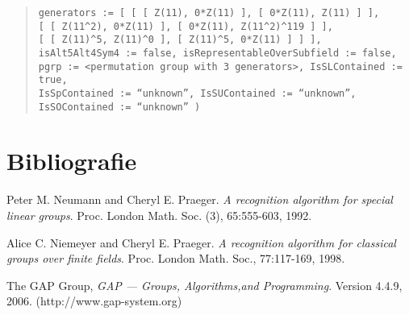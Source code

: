 \documentclass[a4paper,11pt]{article}
\theoremstyle{bla}
\begin{document}
\begin{quote}
  \hspace*{-1cm} \texttt{generators := [ [ [ Z(11), 0*Z(11) ], [ 0*Z(11), Z(11) ] ],}\\
      \hspace*{-1cm} \texttt{[ [ Z(11\^{}2), 0*Z(11) ], [ 0*Z(11), Z(11\^{}2)\^{}119 ] ],}\\
      \hspace*{-1cm} \texttt{[ [ Z(11)\^{}5, Z(11)\^{}0 ], [ Z(11)\^{}5, 0*Z(11) ] ] ],}\\
  \hspace*{-1cm} \texttt{isAlt5Alt4Sym4 := false, isRepresentableOverSubfield := false,}\\
  \hspace*{-1cm} \texttt{pgrp := <permutation group with 3 generators>, IsSLContained := true,}\\
  \hspace*{-1cm} \texttt{IsSpContained := ``unknown'', IsSUContained := ``unknown'',}\\
  \hspace*{-1cm} \texttt{IsSOContained := ``unknown'' )}

\end{quote}


\section{Bibliografie}

\begin{thebibliography}{bibl}
  Peter M. Neumann and Cheryl E. Praeger. \textit{A recognition algorithm for special linear groups}. Proc. London Math. Soc. (3), 65:555-603, 1992.

  Alice C. Niemeyer and Cheryl E. Praeger. \textit{A recognition algorithm for classical groups over finite fields}. Proc. London Math. Soc., 77:117-169, 1998.

  The GAP Group, \textit{GAP --- Groups, Algorithms,and Programming}. Version 4.4.9, 2006. (http://www.gap-system.org)
\end{thebibliography}

\end{document}
